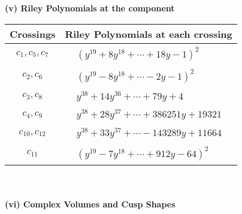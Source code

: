 \documentclass[1p]{elsarticle_modified}
\theoremstyle{definition}
\begin{document}
\newpage\renewcommand{\arraystretch}{1}
\flushleft \textbf{(v) Riley Polynomials at the component}\newline \\
\begin{tabular}{m{50pt}|m{274pt}}
Crossings & \hspace{64pt}Riley Polynomials at each crossing \\
\hline $$\begin{aligned}c_{1},c_{5},c_{7}\end{aligned}$$&$\begin{aligned}
&(y^{19}+8 y^{18}+\cdots+18 y-1)^{2}
\end{aligned}$\\
\hline $$\begin{aligned}c_{2},c_{6}\end{aligned}$$&$\begin{aligned}
&(y^{19}-8 y^{18}+\cdots-2 y-1)^{2}
\end{aligned}$\\
\hline $$\begin{aligned}c_{3},c_{8}\end{aligned}$$&$\begin{aligned}
&y^{38}+14 y^{36}+\cdots+79 y+4
\end{aligned}$\\
\hline $$\begin{aligned}c_{4},c_{9}\end{aligned}$$&$\begin{aligned}
&y^{38}+28 y^{37}+\cdots+386251 y+19321
\end{aligned}$\\
\hline $$\begin{aligned}c_{10},c_{12}\end{aligned}$$&$\begin{aligned}
&y^{38}+33 y^{37}+\cdots-143289 y+11664
\end{aligned}$\\
\hline $$\begin{aligned}c_{11}\end{aligned}$$&$\begin{aligned}
&(y^{19}-7 y^{18}+\cdots+912 y-64)^{2}
\end{aligned}$\\
\hline
\end{tabular}\\~\\
\newpage\flushleft \textbf{(vi) Complex Volumes and Cusp Shapes}
\end{document}
